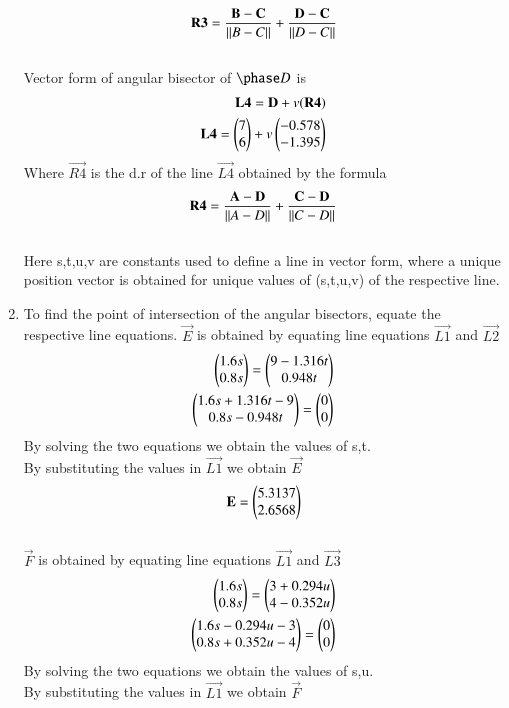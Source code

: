 \begin{enumerate}[label=\thesection.\arabic*.,ref=\thesection.\theenumi]
\\
$$\mathbf{R3} = \frac{\mathbf{B}-\mathbf{C}}{\left\lVert B-C\right\rVert}+\frac{\mathbf{D}-\mathbf{C}}{\left\lVert D-C\right\rVert}$$
\\
Vector form of angular bisector of $\phase D$ is
\begin{align}
\label{eq:constr_d}
\mathbf{L4} = \mathbf{D}+v(\mathbf{R4})
\\
\mathbf{L4} = \begin{pmatrix}7\\6\end{pmatrix}+v\begin{pmatrix}-0.578\\-1.395\end{pmatrix}
\end{align}
Where $\vec{R4}$ is the d.r of the line $\vec{L4}$ obtained by the formula
\\
$$\mathbf{R4} = \frac{\mathbf{A}-\mathbf{D}}{\left\lVert A-D\right\rVert}+\frac{\mathbf{C}-\mathbf{D}}{\left\lVert C-D\right\rVert}$$
\\ 
Here s,t,u,v are constants used to define a line in vector form, where a unique position vector is obtained for unique values of (s,t,u,v) of the respective line.
\\
\item To find the point of intersection of the angular bisectors, equate the respective line equations.
\solution
$\vec{E}$ is obtained by equating line equations $\vec{L1}$ and $\vec{L2}$
\begin{align}
\begin{pmatrix}1.6s\\0.8s\end{pmatrix}=\begin{pmatrix}9-1.316t\\0.948t\end{pmatrix}
\\
\begin{pmatrix}1.6s+1.316t-9\\0.8s-0.948t\end{pmatrix}=\begin{pmatrix}0\\0\end{pmatrix}
\end{align}
By solving the two equations we obtain the values of s,t.
\\
By substituting the values in $\vec{L1}$ we obtain $\vec{E}$
\\
$$\mathbf{E}=\begin{pmatrix}5.3137\\2.6568\end{pmatrix}$$
\\
$\vec{F}$ is obtained by equating line equations $\vec{L1}$ and $\vec{L3}$
\begin{align}
\begin{pmatrix}1.6s\\0.8s\end{pmatrix}=\begin{pmatrix}3+0.294u\\4-0.352u\end{pmatrix}
\\
\begin{pmatrix}1.6s-0.294u-3\\0.8s+0.352u-4\end{pmatrix}=\begin{pmatrix}0\\0\end{pmatrix}
\end{align}
By solving the two equations we obtain the values of s,u.
\\
By substituting the values in $\vec{L1}$ we obtain $\vec{F}$
\\

\end{enumerate}
